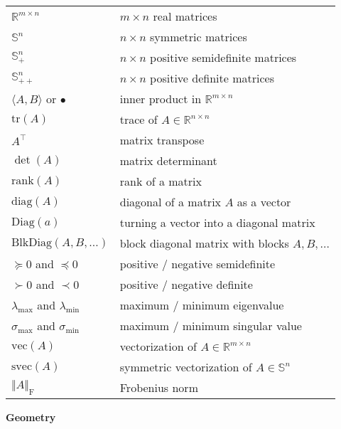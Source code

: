 \documentclass[
]{book}
\theoremstyle{definition}
\theoremstyle{definition}
\theoremstyle{definition}
\theoremstyle{definition}
\theoremstyle{remark}
\begin{document}
\begin{longtable}[]{@{}
  >{\raggedright\arraybackslash}p{}
  >{\raggedright\arraybackslash}p{}@{}}
\toprule()
\endhead
\(\mathbb{R}^{m \times n}\) & \(m \times n\) real matrices \\
\(\mathbb{S}^{n}\) & \(n\times n\) symmetric matrices \\
\(\mathbb{S}^{n}_{+}\) & \(n\times n\) positive semidefinite matrices \\
\(\mathbb{S}^{n}_{++}\) & \(n\times n\) positive definite matrices \\
\(\langle A, B \rangle\) or \(\bullet\) & inner product in \(\mathbb{R}^{m \times n}\) \\
\(\mathrm{tr}(A)\) & trace of \(A \in \mathbb{R}^{n \times n}\) \\
\(A^\top\) & matrix transpose \\
\(\det(A)\) & matrix determinant \\
\(\mathrm{rank}(A)\) & rank of a matrix \\
\(\mathrm{diag}(A)\) & diagonal of a matrix \(A\) as a vector \\
\(\mathrm{Diag}(a)\) & turning a vector into a diagonal matrix \\
\(\mathrm{BlkDiag}(A,B,\dots)\) & block diagonal matrix with blocks \(A,B,\dots\) \\
\(\succeq 0\) and \(\preceq 0\) & positive / negative semidefinite \\
\(\succ 0\) and \(\prec 0\) & positive / negative definite \\
\(\lambda_{\max}\) and \(\lambda_{\min}\) & maximum / minimum eigenvalue \\
\(\sigma_{\max}\) and \(\sigma_{\min}\) & maximum / minimum singular value \\
\(\mathrm{vec}(A)\) & vectorization of \(A \in \mathbb{R}^{m \times n}\) \\
\(\mathrm{svec}(A)\) & symmetric vectorization of \(A \in \mathbb{S}^{n}\) \\
\(\Vert A \Vert_\mathrm{F}\) & Frobenius norm \\
\bottomrule()
\end{longtable}

\textbf{Geometry}
\end{document}
